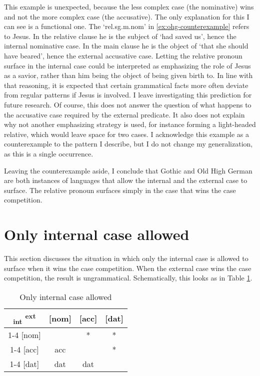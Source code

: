 This example is unexpected, because the less complex case (the nominative) wins and not the more complex case (the accusative).
The only explanation for this I can see is a functional one. The  `\ac{rel}.\ac{sg}.\ac{m}.\ac{nom}' in \ref{ex:ohg-counterexample} refers to Jesus. In the relative clause he is the subject of  `had saved us', hence the internal nominative case. In the main clause he is the object of  `that she should have beared', hence the external accusative case.
Letting the relative pronoun surface in the internal case could be interpreted as emphasizing the role of Jesus as a savior, rather than him being the object of being given birth to. In line with that reasoning, it is expected that certain grammatical facts more often deviate from regular patterns if Jesus is involved. I leave investigating this prediction for future research.
Of course, this does not answer the question of what happens to the accusative case required by the external predicate. It also does not explain why not another emphasizing strategy is used, for instance forming a light-headed relative, which would leave space for two cases.
I acknowledge this example as a counterexample to the pattern I describe, but I do not change my generalization, as this is a single occurrence.

Leaving the counterexample aside, I conclude that Gothic and Old High German are both instances of languages that allow the internal and the external case to surface. The relative pronoun surfaces simply in the case that wins the case competition.


\section{Only internal case allowed}\label{sec:pattern-ii}

This section discusses the situation in which only the internal case is allowed to surface when it wins the case competition. When the external case wins the case competition, the result is ungrammatical. Schematically, this looks as in Table \ref{tbl:case-competition-only-int-repeated}.

\begin{table}[H]
  \center
  \caption{Only internal case allowed}
  \begin{tabular}{c|c|c|c}
    \toprule
    \textsubscript{\ac{int}} \textsuperscript{\ac{ext}}
           & [\ac{nom}]
           & [\ac{acc}]
           & [\ac{dat}]
           \\ \cmidrule{1-4}
       [\ac{nom}]
           & \xcancel{\phantom{xx}}
           & *
           & *
           \\ \cmidrule{1-4}
       [\ac{acc}]
           & \ac{acc}
           & \xcancel{\phantom{xx}}
           & *
           \\ \cmidrule{1-4}
       [\ac{dat}]
           & \ac{dat}
           & \ac{dat}
           & \xcancel{\phantom{xx}}
           \\
     \bottomrule
  \end{tabular}
    \label{tbl:case-competition-only-int-repeated}
\end{table}


